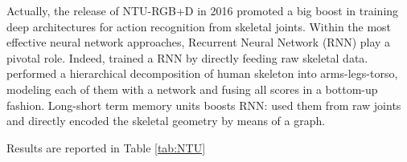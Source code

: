 \documentclass[10pt,twocolumn]{article}
\begin{document}
Actually, the release of NTU-RGB+D in 2016 promoted a big boost in training deep architectures for action recognition from skeletal joints. Within the most effective neural network approaches, Recurrent Neural Network (RNN) play a pivotal role. Indeed, \cite{Shahroudy:CVPR16} trained a RNN by directly feeding raw skeletal data. \cite{Du:CVPR15} performed a hierarchical decomposition of human skeleton into arms-legs-torso, modeling each of them with a network and fusing all scores in a bottom-up fashion. Long-short term memory units boosts RNN: \cite{Shahroudy:CVPR16} used them from raw joints and \cite{Liu:ECCV16} directly encoded the skeletal geometry by means of a graph. 

Results are reported in Table \ref{tab:NTU}

\end{document}
